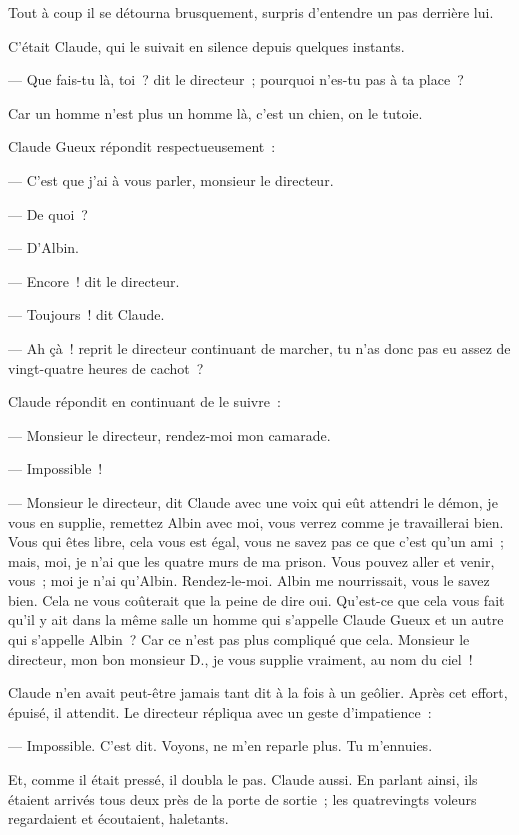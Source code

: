 \documentclass[french,twoside]{book} %
\begin{document}
Tout à coup il se détourna brusquement, surpris d’entendre un pas derrière lui.\par
C’était Claude, qui le suivait en silence depuis quelques instants.\par
— Que fais-tu là, toi ? dit le directeur ; pourquoi n’es-tu pas à ta place ?\par
Car un homme n’est plus un homme là, c’est un chien, on le tutoie.\par
Claude Gueux répondit respectueusement :\par
 — C’est que j’ai à vous parler, monsieur le directeur.\par
— De quoi ?\par
— D’Albin.\par
— Encore ! dit le directeur.\par
— Toujours ! dit Claude.\par
— Ah çà ! reprit le directeur continuant de marcher, tu n’as donc pas eu assez de vingt-quatre heures de cachot ?\par
Claude répondit en continuant de le suivre :\par
— Monsieur le directeur, rendez-moi mon camarade.\par
— Impossible !\par
— Monsieur le directeur, dit Claude avec une voix qui eût attendri le démon, je vous en supplie, remettez Albin avec moi, vous verrez comme je travaillerai bien. Vous qui êtes libre, cela vous est égal, vous ne savez pas ce que c’est qu’un ami ; mais, moi, je n’ai que les quatre murs de ma prison. Vous pouvez aller et venir, vous ; moi je n’ai qu’Albin. Rendez-le-moi. Albin me nourrissait, vous le savez bien. Cela ne vous coûterait que la peine de dire oui. Qu’est-ce que cela vous fait qu’il y ait dans la même salle un homme qui s’appelle Claude Gueux et un autre qui s’appelle Albin ? Car ce n’est pas plus compliqué que cela. Monsieur le directeur, mon bon monsieur D., je vous supplie vraiment, au nom du ciel !\par
Claude n’en avait peut-être jamais tant dit à la fois à un geôlier. Après cet effort, épuisé, il attendit. Le directeur répliqua avec un geste d’impatience :\par
 — Impossible. C’est dit. Voyons, ne m’en reparle plus. Tu m’ennuies.\par
Et, comme il était pressé, il doubla le pas. Claude aussi. En parlant ainsi, ils étaient arrivés tous deux près de la porte de sortie ; les quatrevingts voleurs regardaient et écoutaient, haletants.\par
\end{document}
